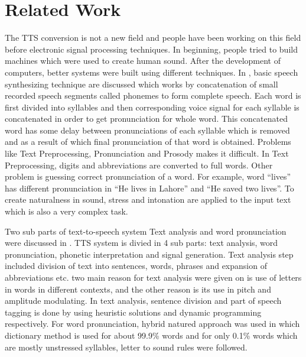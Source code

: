 \chapter{Related Work}

The TTS conversion is not a new field and people have been working on this field before electronic
signal processing techniques. In beginning, people tried to build machines which were used to
create human sound. After the development of computers, better systems were built using different
techniques. In \cite{swetha2013text}, basic speech synthesizing technique are discussed 
which works by concatenation of small recorded speech segments called phonemes to form
complete speech. Each word is first divided into syllables and then corresponding voice signal for each syllable
is concatenated in order to get pronunciation for whole word. This concatenated word has some
delay between pronunciations of each syllable which is removed and as a result of which final
pronunciation of that word is obtained. Problems like Text Preprocessing, Pronunciation and
Prosody makes it difficult. In Text Preprocessing, digits and abbreviations are converted to full
words. Other problem is guessing correct pronunciation of a word. For example, word “lives” has
different pronunciation in “He lives in Lahore” and “He saved two lives”. To create naturalness in
sound, stress and intonation are applied to the input text which is also a very complex task.

Two sub parts of text-to-speech system Text analysis and word pronunciation were discussed in \cite{liberman1992text}. 
TTS system is divied in 4 sub parts: text analysis, word pronunciation, phonetic interpretation and signal
generation. Text analysis step included division of text into sentences, words, phrases and expansion of abbreviations etc.
two main reason for text analysis were given on is use of letters in words in different contexts, and the other reason is its use
in pitch and amplitude modulating. In text analysis, sentence division and part of speech tagging is done by using heuristic solutions \cite{riley1989some}
and dynamic programming respectively. For word pronunciation, hybrid natured approach was used in which dictionary method is used for about 99.9\%
words and for only 0.1\% words which are mostly unstressed syllables, letter to sound rules were followed. 

